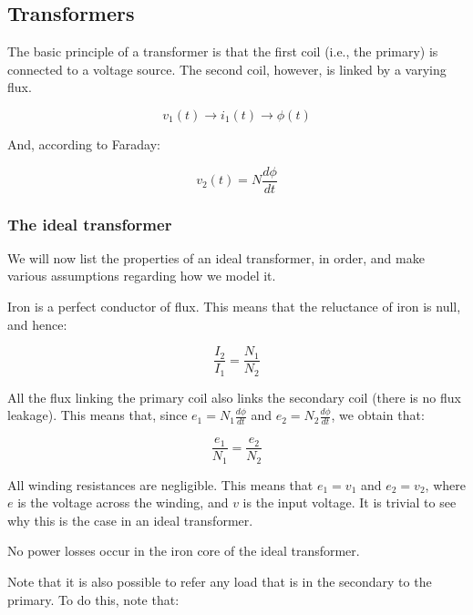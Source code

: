 \documentclass{article}
\begin{document}
\newpage

\subsection{Transformers}

The basic principle of a transformer is that the first coil (i.e., the primary) is connected to a voltage source. The second coil, however, is linked by a varying flux.

\[ v_1(t) \to i_1(t) \to \phi (t) \]

And, according to Faraday:

\[ v_2(t) = N \frac{d\phi}{dt} \] 

\subsubsection{The ideal transformer}

We will now list the properties of an ideal transformer, in order, and make various assumptions regarding how we model it.

\begin{proposition}
    Iron is a perfect conductor of flux. This means that the reluctance of iron is null, and hence:

    \[ \frac{I_2}{I_1} = \frac{N_1}{N_2} \]
\end{proposition}

\begin{proposition}
    All the flux linking the primary coil also links the secondary coil (there is no flux leakage). This means that, since $e_1 = N_1\frac{d\phi}{dt}$ and $e_2 = N_2\frac{d\phi}{dt}$, we obtain that:

    \[ \frac{e_1}{N_1} = \frac{e_2}{N_2} \] 
\end{proposition}

\begin{proposition}
    All winding resistances are negligible. This means that $e_1 = v_1$ and $e_2 = v_2$, where $e$ is the voltage across the winding, and $v$ is the input voltage. It is trivial to see why this is the case in an ideal transformer.
\end{proposition}

\begin{proposition}
    No power losses occur in the iron core of the ideal transformer.
\end{proposition}

Note that it is also possible to refer any load that is in the secondary to the primary. To do this, note that:
\end{document}
